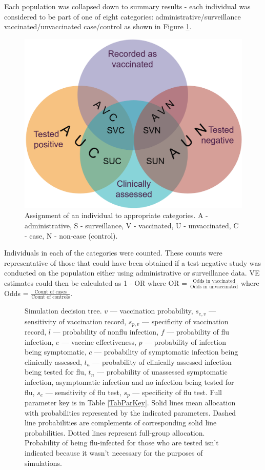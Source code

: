 \documentclass[11pt]{article}
\begin{document}
Each population was collapsed down to summary results - each individual was considered to be part of one of eight categories: administrative/surveillance vaccinated/unvaccinated case/control as shown in Figure \ref{PopAgg}.

\begin{figure}[h]
	\centering
		\includegraphics[width=0.5\linewidth]{../sim-diag/popagg-venn.png}
		\caption{
Assignment of an individual to appropriate categories. A - administrative, S - surveillance, V - vaccinated, U - unvaccinated, C - case, N - non-case (control). \label{PopAgg}
		}
\end{figure}

Individuals in each of the categories were counted. These counts were representative of those that could have been obtained if a test-negative study was conducted on the population either using administrative or surveillance data. VE estimates could then be calculated as 1 - OR where OR = $\frac{\text{Odds in vaccinated}}{\text{Odds in unvaccinated}}$ where Odds = $\frac{\text{Count of cases}}{\text{Count of controls}}$.

\pagebreak

\begin{figure}[H]
	\centering
		
		\caption{
Simulation decision tree. $v$ --- vaccination probability, $s_{e,v}$ --- sensitivity of vaccination record, $s_{p,v}$ --- specificity of vaccination record, $l$ --- probability of nonflu infection, $f$ --- probability of flu infection, $e$ --- vaccine effectiveness, $p$ --- probability of infection being symptomatic, $c$ --- probability of symptomatic infection being clinically assessed, $t_a$ --- probability of clinically assessed infection being tested for flu, $t_n$ --- probability of unassessed symptomatic infection, asymptomatic infection and no infection being tested for flu, $s_e$ --- sensitivity of flu test, $s_p$ --- specificity of flu test. Full parameter key is in Table \ref{TabParKey}. Solid lines mean allocation with probabilities represented by the indicated parameters. Dashed line probabilities are complements of corresponding solid line probabilities. Dotted lines represent full-group allocation. Probability of being flu-infected for those who are tested isn't indicated because it wasn't necessary for the purposes of simulations. \label{SimDiag}
		}
\end{figure}
\end{document}
